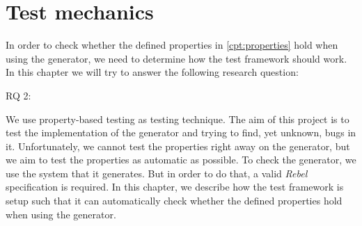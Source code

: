 \chapter{Test mechanics}
\label{cpt:testmechanics}
In order to check whether the defined properties in \autoref{cpt:properties}
hold when using the generator, we need to determine how the test framework
should work. In this chapter we will try to answer the following research
question:
\begin{description}
  \item [RQ 2:] \rqTwo
\end{description}
%
We use property-based testing as testing technique. The aim of this project is
to test the implementation of the generator and trying to find, yet unknown,
bugs in it. Unfortunately, we cannot test the properties right away on the
generator, but we aim to test the properties as automatic as possible. To check
the generator, we use the system that it generates. But in order to do that, a
valid \textit{Rebel} specification is required. In this chapter, we describe how
the test framework is setup such that it can automatically check whether the
defined properties hold when using the generator.

